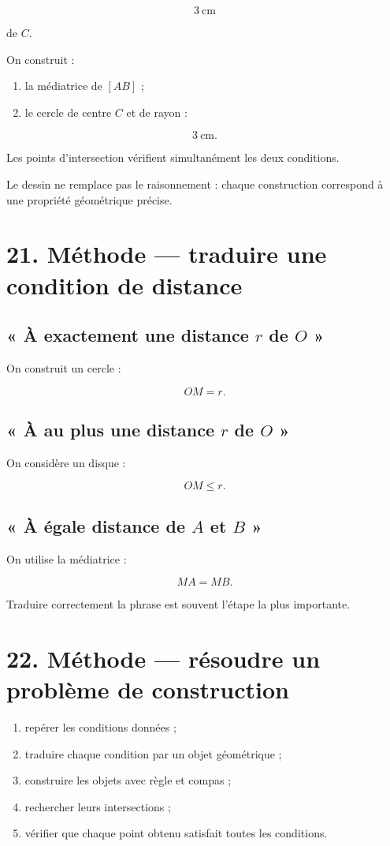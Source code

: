 \[
3\ \text{cm}
\]

de $C$.

On construit :

\begin{enumerate}
\item la médiatrice de $[AB]$ ;
\item le cercle de centre $C$ et de rayon :
\end{enumerate}

\[
3\ \text{cm}.
\]

Les points d’intersection vérifient simultanément les deux conditions.

Le dessin ne remplace pas le raisonnement : chaque construction correspond à une propriété géométrique précise.

\section{21. Méthode — traduire une condition de distance}

\subsection{« À exactement une distance $r$ de $O$ »}

On construit un cercle :

\[
OM=r.
\]

\subsection{« À au plus une distance $r$ de $O$ »}

On considère un disque :

\[
OM\le r.
\]

\subsection{« À égale distance de $A$ et $B$ »}

On utilise la médiatrice :

\[
MA=MB.
\]

Traduire correctement la phrase est souvent l’étape la plus importante.

\section{22. Méthode — résoudre un problème de construction}

\begin{enumerate}
\item repérer les conditions données ;
\item traduire chaque condition par un objet géométrique ;
\item construire les objets avec règle et compas ;
\item rechercher leurs intersections ;
\item vérifier que chaque point obtenu satisfait toutes les conditions.
\end{enumerate}

